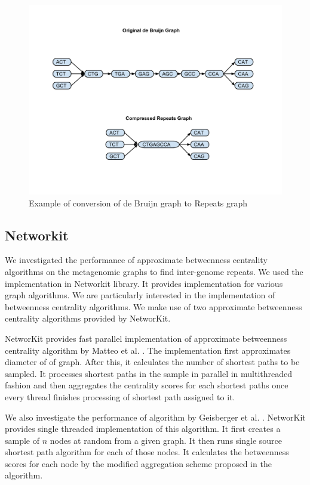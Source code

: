 \documentclass[runningheads,a4paper]{llncs}
\begin{document}
\begin{figure}[htbp]
\centering
\includegraphics[width = \textwidth]{repeatgraph}
\caption{Example of conversion of de Bruijn graph to Repeats graph}
\label{fig:repeatgraph}
\end{figure}

\subsection*{Networkit}
We investigated the performance of approximate betweenness centrality algorithms on the metagenomic graphs to find inter-genome repeats. We used the implementation in Networkit\cite{networkit} library. It provides implementation for various graph algorithms. We are particularly interested in the implementation of betweenness centrality algorithms. We make use of two approximate betweenness centrality algorithms provided by NetworKit. 

NetworKit provides fast parallel implementation of approximate betweenness centrality algorithm by Matteo et al. \cite{matteo}. The implementation first approximates diameter of of graph. After this, it calculates the number of shortest paths to be sampled. It processes shortest paths in the sample in parallel in multithreaded fashion and then aggregates the centrality scores for each shortest paths once every thread finishes processing of shortest path assigned to it. 

We also investigate the performance of algorithm by Geisberger et al. \cite{sanders}. NetworKit provides single threaded implementation of this algorithm. It first creates a sample of $n$ nodes at random from a given graph. It then runs single source shortest path algorithm for each of those nodes. It calculates the betweenness scores for each node by the modified aggregation scheme proposed in the algorithm. 
\end{document}
